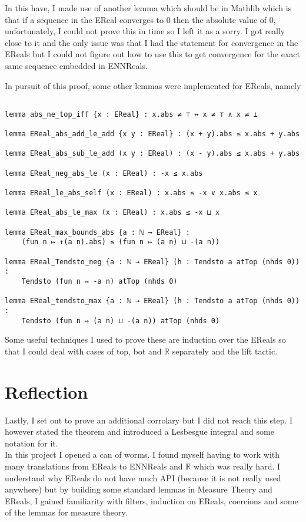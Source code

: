 \documentclass{article}
\renewcommand{\texttt}[1]{{\small\ttfamily #1}}
\begin{document}
In this have, I made use of another lemma which should be in Mathlib which is that if a sequence in the EReal converges to 0 then the absolute value of 0, unfortunately, I could not prove this in time so I left it as a sorry. I got really close to it and the only issue was that I had the statement for convergence in the \texttt{EReal}s but I could not figure out how to use this to get convergence for the exact same sequence embedded in \texttt{ENNReal}s.

In pursuit of this proof, some other lemmas were implemented for \texttt{EReals}, namely

\begin{verbatim}

lemma abs_ne_top_iff {x : EReal} : x.abs ≠ ⊤ ↔ x ≠ ⊤ ∧ x ≠ ⊥

lemma EReal_abs_add_le_add {x y : EReal} : (x + y).abs ≤ x.abs + y.abs

lemma EReal_abs_sub_le_add (x y : EReal) : (x - y).abs ≤ x.abs + y.abs

lemma EReal_neg_abs_le (x : EReal) : -x ≤ x.abs

lemma EReal_le_abs_self (x : EReal) : x.abs ≤ -x ∨ x.abs ≤ x

lemma EReal_abs_le_max (x : EReal) : x.abs ≤ -x ⊔ x

lemma EReal_max_bounds_abs {a : ℕ → EReal} : 
    (fun n ↦ ↑(a n).abs) ≤ (fun n ↦ (a n) ⊔ -(a n))

lemma EReal_Tendsto_neg {a : ℕ → EReal} (h : Tendsto a atTop (nhds 0)) :
    Tendsto (fun n ↦ -a n) atTop (nhds 0)

lemma EReal_tendsto_max {a : ℕ → EReal} (h : Tendsto a atTop (nhds 0)) :
    Tendsto (fun n ↦ (a n) ⊔ -(a n)) atTop (nhds 0)

\end{verbatim}

Some useful techniques I used to prove these are induction over the \texttt{EReal}s so that I could deal with cases of top, bot and \(\mathbb{R}\) separately and the lift tactic.

\section*{Reflection}

Lastly, I set out to prove an additional corrolary but I did not reach this step. I however stated the theorem and introduced a Lesbesgue integral and some notation for it.\\

In this project I opened a can of worms. I found myself having to work with many translations from \texttt{EReal}s to \texttt{ENNReal}s and \(\mathbb{R}\) which was really hard. I understand why EReals do not have much API (because it is not really used anywhere) but by building some standard lemmas in Measure Theory and EReals, I gained familiarity with filters, induction on EReals, coercions and some of the lemmas for measure theory.
\end{document}
